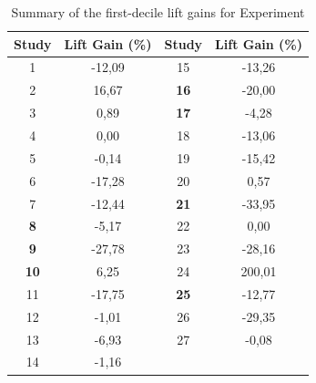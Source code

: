 \begin{table}[h]
\centering
\begin{tabular}{|c|c|c|c|}
\hline
\textbf{Study} & \textbf{Lift Gain (\%)}        & \textbf{Study} & \textbf{Lift Gain (\%)}        \\ \hline
1              & \cellcolor[HTML]{ff514d}-12,09 & 15             & \cellcolor[HTML]{ff514d}-13,26 \\ \hline
2              & \cellcolor[HTML]{8ed08e}16,67  & \textbf{16}    & \cellcolor[HTML]{ff514d}-20,00 \\ \hline
3              & \cellcolor[HTML]{8ed08e}0,89   & \textbf{17}    & \cellcolor[HTML]{ffccc9}-4,28  \\ \hline
4              & 0,00                           & 18             & \cellcolor[HTML]{ff514d}-13,06 \\ \hline
5              & \cellcolor[HTML]{ffccc9}-0,14  & 19             & \cellcolor[HTML]{ff514d}-15,42 \\ \hline
6              & \cellcolor[HTML]{ff514d}-17,28 & 20             & \cellcolor[HTML]{8ed08e}0,57   \\ \hline
7              & \cellcolor[HTML]{ff514d}-12,44 & \textbf{21}    & \cellcolor[HTML]{ff514d}-33,95 \\ \hline
\textbf{8}     & \cellcolor[HTML]{ffccc9}-5,17  & 22             & 0,00                           \\ \hline
\textbf{9}     & \cellcolor[HTML]{ff514d}-27,78 & 23             & \cellcolor[HTML]{ff514d}-28,16 \\ \hline
\textbf{10}    & \cellcolor[HTML]{8ed08e}6,25   & 24             & \cellcolor[HTML]{ffce93}200,01 \\ \hline
11             & \cellcolor[HTML]{ff514d}-17,75 & \textbf{25}    & \cellcolor[HTML]{ff514d}-12,77 \\ \hline
12             & \cellcolor[HTML]{ffccc9}-1,01  & 26             & \cellcolor[HTML]{ff514d}-29,35 \\ \hline
13             & \cellcolor[HTML]{ff514d}-6,93  & 27             & \cellcolor[HTML]{ffccc9}-0,08  \\ \hline
14             & \cellcolor[HTML]{ffccc9}-1,16  &                &                                \\ \hline
\end{tabular}
\caption{Summary of the first-decile lift gains for Experiment \nameExperimentI}
\label{table:lift_gain_exp-i}
\end{table}

